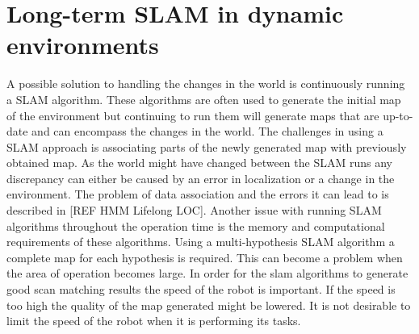 \section{Long-term SLAM in dynamic environments}
A possible solution to handling the changes in the world is continuously running a SLAM algorithm. 
These algorithms are often used to generate the initial map of the environment but continuing to run them will generate maps that are up-to-date and can encompass the changes in the world. The challenges in using a SLAM approach is associating parts of the newly generated map with previously obtained map. 
As the world might have changed between the SLAM runs any discrepancy can either be caused by an error in localization or a change in the environment. 
The problem of data association and the errors it can lead to is described in [REF HMM Lifelong LOC]. 
Another issue with running SLAM algorithms throughout the operation time is the memory and computational requirements of these algorithms. Using a multi-hypothesis SLAM algorithm a complete map for each hypothesis is required. This can become a problem when the area of operation becomes large. 
In order for the slam algorithms to generate good scan matching results the speed of the robot is important. If the speed is too high the quality of the map generated might be lowered. It is not desirable to limit the speed of the robot when it is performing its tasks. 
